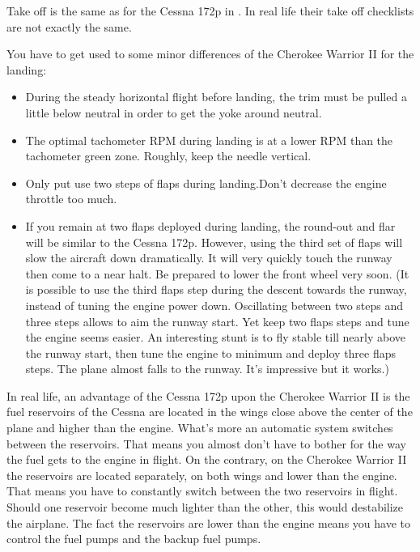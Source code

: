 \begin{itemize}
Take off is the same as for the Cessna 172p in \FlightGear. In real life their
take off checklists are not exactly the same.

You have to get used to some minor differences of the Cherokee Warrior II for
the landing:

\begin{itemize}
    \item During the steady horizontal flight before landing, the trim must be
   pulled a little below neutral in order to get the yoke around neutral.
    \item The optimal tachometer RPM during landing is at a lower RPM than the
  tachometer green zone. Roughly, keep the needle vertical.
    \item Only put use two steps of flaps during landing.Don't decrease the
  engine throttle too much.
    \item If you remain at two flaps deployed during landing, the round-out and
  flar will be similar to the Cessna 172p. However, using the third set of
  flaps will slow the aircraft down dramatically. It will very quickly touch
  the runway then come to a near halt. Be prepared to lower the front wheel
  very soon. (It is possible to use the third flaps step during the descent
  towards the runway, instead of tuning the engine power down. Oscillating
  between two steps and three steps allows to aim the runway start. Yet keep
  two flaps steps and tune the engine seems easier. An interesting stunt is to
  fly stable till nearly above the runway start, then tune the engine to
  minimum and deploy three flaps steps. The plane almost falls to the runway.
  It's impressive but it works.)
\end{itemize}

In real life, an advantage of the Cessna 172p upon the Cherokee
Warrior II is the fuel reservoirs of the Cessna are located in the
wings close above the center of the plane and higher than the engine.
What's more an automatic system switches between the reservoirs. That
means you almost don't have to bother for the way the fuel gets to the
engine in flight. On the contrary, on the Cherokee Warrior II the
reservoirs are located separately, on both wings and lower than the
engine. That means you have to constantly switch between the two
reservoirs in flight. Should one reservoir become much lighter than the
other, this would destabilize the airplane. The fact the reservoirs are
lower than the engine means you have to control the fuel pumps and the
backup fuel pumps.


\end{itemize}
